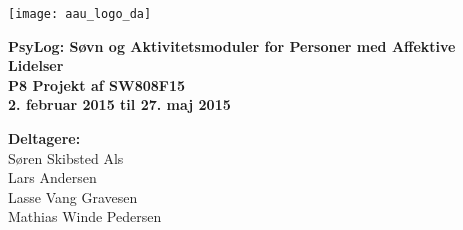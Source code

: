 \hspace*{-1cm}\parbox[b][\textheight][t]{\textwidth}
{

\begin{center}
	\texttt{[image: aau\_logo\_da]}\\
	\vspace{0.25cm}
\end{center} 

\vspace{1cm}
\begin{center}

\textbf{\Huge {PsyLog: Søvn og Aktivitetsmoduler for Personer med Affektive Lidelser}} \\ \vspace{0.5cm}
\textbf{\Large P8 Projekt af SW808F15}\\ \vspace{0.5cm}
\textbf{\large 2. februar 2015 til 27. maj 2015}\\
\end{center}



\vspace{0.25cm}
\begin{center}
\item {\textbf{Deltagere:}} \\
Søren Skibsted Als\\
Lars Andersen\\
Lasse Vang Gravesen\\
Mathias Winde Pedersen
\end{center}

\thispagestyle{empty}

\newpage
\thispagestyle{empty}
\mbox{}
}